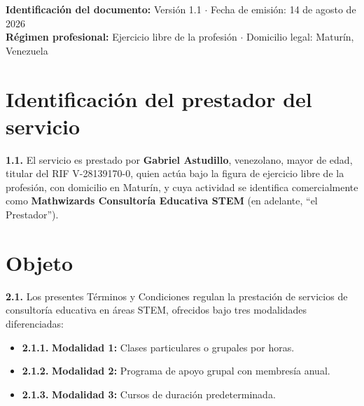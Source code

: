\documentclass[12pt, letterpaper]{article}
\begin{document}


\vspace{4pt}
\begin{cuadroinfo}
  \small
  \textbf{Identificación del documento:}\quad
  Versión 1.1 $\cdot$ Fecha de emisión: 14 de agosto de 2026\\[2pt]
  \textbf{Régimen profesional:}\quad
  Ejercicio libre de la profesión $\cdot$ Domicilio legal: Maturín, Venezuela
\end{cuadroinfo}

\vspace{8pt}

\section{Identificación del prestador del servicio}

\noindent\textbf{1.1.} El servicio es prestado por \textbf{Gabriel Astudillo}, venezolano, mayor de edad, titular del RIF V-28139170-0, quien actúa bajo la figura de ejercicio libre de la profesión, con domicilio en Maturín, y cuya actividad se identifica comercialmente como \textbf{Mathwizards Consultoría Educativa STEM} (en adelante, ``el Prestador'').

\section{Objeto}

\noindent\textbf{2.1.} Los presentes Términos y Condiciones regulan la prestación de servicios de consultoría educativa en áreas STEM, ofrecidos bajo tres modalidades diferenciadas:

\begin{itemize}[leftmargin=1.5em, itemsep=3pt, topsep=4pt]
  \item \textbf{2.1.1.} \textbf{Modalidad 1:} Clases particulares o grupales por horas.
  \item \textbf{2.1.2.} \textbf{Modalidad 2:} Programa de apoyo grupal con membresía anual.
  \item \textbf{2.1.3.} \textbf{Modalidad 3:} Cursos de duración predeterminada.
\end{itemize}
\end{document}
